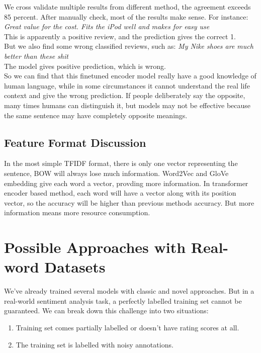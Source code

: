 \documentclass{article}
\begin{document}
\hypertarget{hpf}{{}}We cross validate multiple results from different method, the agreement exceeds 85 percent. After manually check, most of the results make sense. For instance: \\\textit{ Great value for the cost. Fits the iPod well and makes for easy use }\\This is apparently a positive review, and the prediction gives the correct 1.
\\[3mm]But we also find some wrong classified reviews, such as: \textit{My Nike shoes are much better than these shit}\\The model gives positive prediction, which is wrong.
\\[3mm]So we can find that this finetuned encoder model really have a good knowledge of human language, while in some circumstances it cannot understand the real life context and give the wrong prediction. If people deliberately say the opposite, many times humans can distinguish it, but models may not be effective because the same sentence may have completely opposite meanings.




\subsection{Feature Format Discussion}

\hypertarget{hpg}{{}}In the most simple TFIDF format, there is only one vector representing the sentence, BOW will always lose much information. Word2Vec and GloVe embedding give each word a vector, provding more information. In transformer encoder based method, each word will have a vector along with its position vector, so the accuracy will be higher than previous methods accuracy. But more information means more resource consumption.

\section{Possible Approaches with Real-word Datasets}
We’ve already trained several models with classic and novel approaches. But in a real-world sentiment analysis task, a perfectly labelled training set cannot be guaranteed. We can break down this challenge into two situations:
\begin{enumerate}
    \item Training set comes partially labelled or doesn’t have rating scores at all.
    \item The training set is labelled with noisy annotations.
\end{enumerate}
\end{document}
